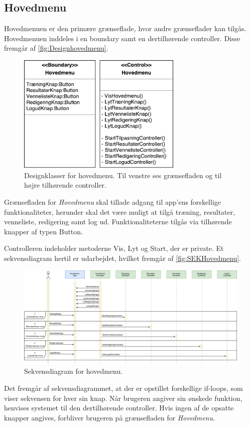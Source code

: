 \subsection*{Hovedmenu} \label{sec:MVCHovedmenu}
Hovedmenuen er den primære grænseflade, hvor andre grænseflader kan tilgås.
Hovedmenuen inddeles i en boundary samt en dertilhørende controller. Disse fremgår af \autoref{fig:Designhovedmenu}.

\begin{figure} [H]
\centering
\includegraphics[width=0.7\textwidth]{figures/MVC/MVCHovedmenu}
\caption{Designklasser for hovedmenu. Til venstre ses grænsefladen og til højre tilhørende controller.}
\label{fig:Designhovedmenu}
\end{figure}

\noindent
Grænsefladen for \textit{Hovedmenu} skal tillade adgang til app'ens forskellige funktionaliteter, herunder skal det være muligt at tilgå træning, resultater, venneliste, redigering samt log ud. Funktionaliteterne tilgås via tilhørende knapper af typen Button. 

Controlleren indeholder metoderne Vis, Lyt og Start, der er private. 
Et sekvensdiagram hertil er udarbejdet, hvilket fremgår af \autoref{fig:SEKHovedmenu}. 

\begin{figure} [H]
\centering
\includegraphics[width=1.55\textwidth, angle=90]{figures/Sek/SEKHovedmenu}
\caption{Sekvensdiagram for hovedmenu.}
\label{fig:SEKHovedmenu}
\end{figure}

\noindent
Det fremgår af sekvensdiagrammet, at der er opstillet forskellige if-loops, som viser sekvensen for hver sin knap. Når brugeren angiver sin ønskede funktion, henvises systemet til den dertilhørende controller. Hvis ingen af de opsatte knapper angives, forbliver brugeren på grænsefladen for \textit{Hovedmenu}.